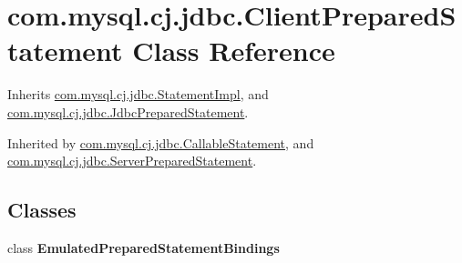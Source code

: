 \hypertarget{classcom_1_1mysql_1_1cj_1_1jdbc_1_1_client_prepared_statement}{}\section{com.\+mysql.\+cj.\+jdbc.\+Client\+Prepared\+Statement Class Reference}
\label{classcom_1_1mysql_1_1cj_1_1jdbc_1_1_client_prepared_statement}


Inherits \mbox{\hyperlink{classcom_1_1mysql_1_1cj_1_1jdbc_1_1_statement_impl}{com.\+mysql.\+cj.\+jdbc.\+Statement\+Impl}}, and \mbox{\hyperlink{interfacecom_1_1mysql_1_1cj_1_1jdbc_1_1_jdbc_prepared_statement}{com.\+mysql.\+cj.\+jdbc.\+Jdbc\+Prepared\+Statement}}.



Inherited by \mbox{\hyperlink{classcom_1_1mysql_1_1cj_1_1jdbc_1_1_callable_statement}{com.\+mysql.\+cj.\+jdbc.\+Callable\+Statement}}, and \mbox{\hyperlink{classcom_1_1mysql_1_1cj_1_1jdbc_1_1_server_prepared_statement}{com.\+mysql.\+cj.\+jdbc.\+Server\+Prepared\+Statement}}.

\subsection*{Classes}
\begin{DoxyCompactItemize}
\item 
class {\bfseries Emulated\+Prepared\+Statement\+Bindings}
\end{DoxyCompactItemize}
